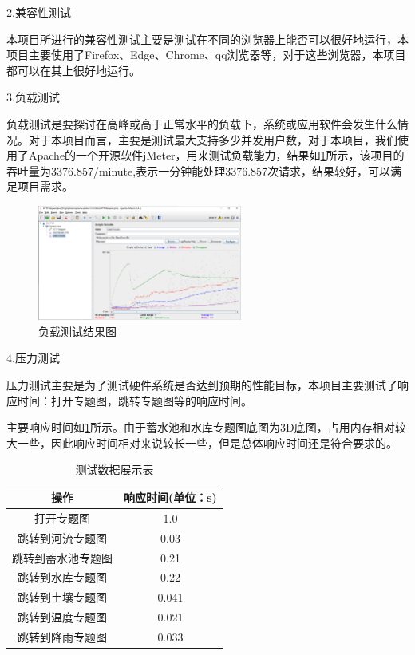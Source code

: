 2.兼容性测试

本项目所进行的兼容性测试主要是测试在不同的浏览器上能否可以很好地运行，本项目主要使用了Firefox、Edge、Chrome、qq浏览器等，对于这些浏览器，本项目都可以在其上很好地运行。

3.负载测试

负载测试是要探讨在高峰或高于正常水平的负载下，系统或应用软件会发生什么情况。对于本项目而言，主要是测试最大支持多少并发用户数，对于本项目，我们使用了Apache的一个开源软件jMeter，用来测试负载能力，结果如\ref{fig:fuzaiceshi}所示，该项目的吞吐量为3376.857/minute,表示一分钟能处理3376.857次请求，结果较好，可以满足项目需求。

\begin{figure}[!htb]%
	\centering
	\includegraphics[width=0.60\textwidth,height=0.3\textheight]{figs/fuzaiceshi.png}
	\caption{负载测试结果图}
	\label{fig:fuzaiceshi}
\end{figure}


4.压力测试

压力测试主要是为了测试硬件系统是否达到预期的性能目标，本项目主要测试了响应时间：打开专题图，跳转专题图等的响应时间。

主要响应时间如\ref{test}所示。由于蓄水池和水库专题图底图为3D底图，占用内存相对较大一些，因此响应时间相对来说较长一些，但是总体响应时间还是符合要求的。
\begin{table}[H]
	\centering
	\caption[测试数据]{测试数据展示表}
	\label{test}
	\begin{tabular}{cc}
		\toprule
		操作          & 响应时间(单位：s)    \\
		\midrule
		打开专题图        &1.0  \\
		跳转到河流专题图     &0.03 \\
		跳转到蓄水池专题图    &0.21    \\
		跳转到水库专题图     &0.22    \\
		跳转到土壤专题图     &0.041    \\
		跳转到温度专题图     &0.021    \\
		跳转到降雨专题图     &0.033    \\
	
		
		\bottomrule
	\end{tabular}
\end{table}



